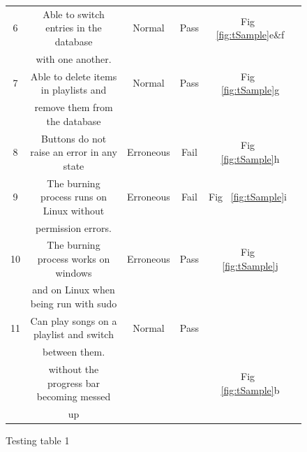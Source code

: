 \documentclass{article}
\begin{document}
\begin{figure}[H]
\begin{center}
\begin{tabular} { | c | c | c | c | c | c |}
            6               &Able to switch entries in the database    &      Normal            &       Pass       &Fig ~\ref{fig:tSample}e\&f\\
                            &with one another.                         &                        &                  &                         \\ \hline
            7               &Able to delete items in playlists and     &      Normal            &       Pass       & Fig ~\ref{fig:tSample}g \\
                            &remove them from the database             &                        &                  &                         \\ \hline
            8               &Buttons do not raise an error in any state&      Erroneous\cite{e1}&       Fail       & Fig ~\ref{fig:tSample}h \\ \hline
            9               &The burning process runs on Linux without &      Erroneous\cite{e2}&       Fail       & Fig ~\ref{fig:tSample}i \\
                            &permission errors.                        &                        &                  &                         \\ \hline
            10              &The burning process works on windows      &      Erroneous         &       Pass       & Fig ~\ref{fig:tSample}j \\
                            &and on Linux when being run with sudo     &                        &                  &                         \\ \hline
            11              &Can play songs on a playlist and switch   &      Normal            &       Pass       &                         \\
                            &between them.                             &                        &                  &                         \\ \hline
                            &without the progress bar becoming messed &                        &                  & Fig ~\ref{fig:tSample}b \\
                            &up                                        &                        &                  &                         \\ \hline
        \end{tabular}
    \end{center}
    \caption{Testing table 1} \label{fig:testTable1}
\end{figure}
\end{document}
